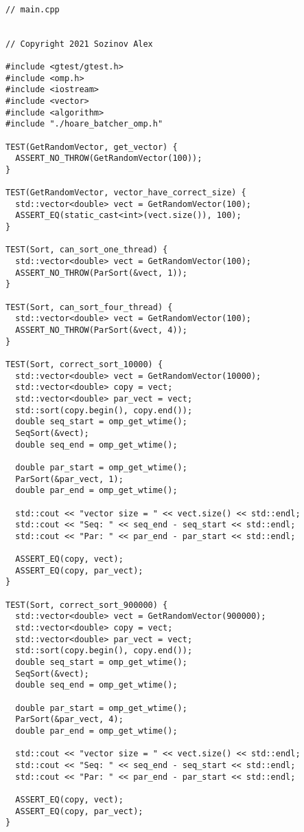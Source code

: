 \documentclass{report}
\begin{document}
\begin{lstlisting}

// main.cpp


// Copyright 2021 Sozinov Alex

#include <gtest/gtest.h>
#include <omp.h>
#include <iostream>
#include <vector>
#include <algorithm>
#include "./hoare_batcher_omp.h"

TEST(GetRandomVector, get_vector) {
  ASSERT_NO_THROW(GetRandomVector(100));
}

TEST(GetRandomVector, vector_have_correct_size) {
  std::vector<double> vect = GetRandomVector(100);
  ASSERT_EQ(static_cast<int>(vect.size()), 100);
}

TEST(Sort, can_sort_one_thread) {
  std::vector<double> vect = GetRandomVector(100);
  ASSERT_NO_THROW(ParSort(&vect, 1));
}

TEST(Sort, can_sort_four_thread) {
  std::vector<double> vect = GetRandomVector(100);
  ASSERT_NO_THROW(ParSort(&vect, 4));
}

TEST(Sort, correct_sort_10000) {
  std::vector<double> vect = GetRandomVector(10000);
  std::vector<double> copy = vect;
  std::vector<double> par_vect = vect;
  std::sort(copy.begin(), copy.end());
  double seq_start = omp_get_wtime();
  SeqSort(&vect);
  double seq_end = omp_get_wtime();

  double par_start = omp_get_wtime();
  ParSort(&par_vect, 1);
  double par_end = omp_get_wtime();

  std::cout << "vector size = " << vect.size() << std::endl;
  std::cout << "Seq: " << seq_end - seq_start << std::endl;
  std::cout << "Par: " << par_end - par_start << std::endl;

  ASSERT_EQ(copy, vect);
  ASSERT_EQ(copy, par_vect);
}

TEST(Sort, correct_sort_900000) {
  std::vector<double> vect = GetRandomVector(900000);
  std::vector<double> copy = vect;
  std::vector<double> par_vect = vect;
  std::sort(copy.begin(), copy.end());
  double seq_start = omp_get_wtime();
  SeqSort(&vect);
  double seq_end = omp_get_wtime();

  double par_start = omp_get_wtime();
  ParSort(&par_vect, 4);
  double par_end = omp_get_wtime();

  std::cout << "vector size = " << vect.size() << std::endl;
  std::cout << "Seq: " << seq_end - seq_start << std::endl;
  std::cout << "Par: " << par_end - par_start << std::endl;

  ASSERT_EQ(copy, vect);
  ASSERT_EQ(copy, par_vect);
}


\end{lstlisting}
\end{document}

